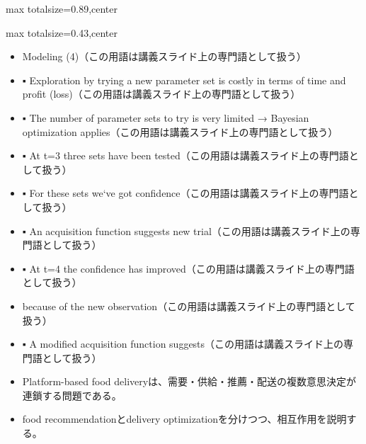 \begin{minipage}[t]{0.58\textwidth}
\begin{adjustbox}{max totalsize={\textwidth}{0.89\textheight},center}
\begin{minipage}{\textwidth}
\end{minipage}
\end{adjustbox}
\end{minipage}


\clearpage
{}
\begin{minipage}[t]{0.405\textwidth}
\begin{adjustbox}{max totalsize={\textwidth}{0.43\textheight},center}
\begin{minipage}{\textwidth}\scriptsize
{}\begin{itemize}
\item Modeling (4)（この用語は講義スライド上の専門語として扱う）
\item ▪ Exploration by trying a new parameter set is costly in terms of time and profit (loss)（この用語は講義スライド上の専門語として扱う）
\item ▪ The number of parameter sets to try is very limited → Bayesian optimization applies（この用語は講義スライド上の専門語として扱う）
\item ▪ At t=3 three sets have been tested（この用語は講義スライド上の専門語として扱う）
\item ▪ For these sets we‘ve got confidence（この用語は講義スライド上の専門語として扱う）
\item ▪ An acquisition function suggests new trial（この用語は講義スライド上の専門語として扱う）
\item ▪ At t=4 the confidence has improved（この用語は講義スライド上の専門語として扱う）
\item because of the new observation（この用語は講義スライド上の専門語として扱う）
\item ▪ A modified acquisition function suggests（この用語は講義スライド上の専門語として扱う）
\end{itemize}\begin{itemize}
\item Platform-based food deliveryは、需要・供給・推薦・配送の複数意思決定が連鎖する問題である。
\item food recommendationとdelivery optimizationを分けつつ、相互作用を説明する。
\end{itemize}
\end{minipage}
\end{adjustbox}
\end{minipage}\hfill
